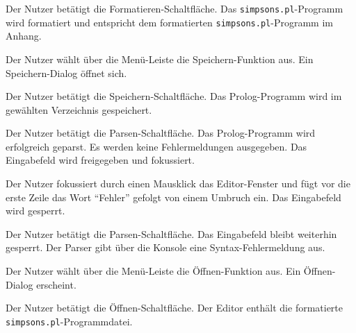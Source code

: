 \documentclass[parskip=full,11pt,twoside]{scrartcl}
\begin{document}
{Der Nutzer betätigt die Formatieren-Schaltfläche.}
{Das \texttt{simpsons.pl}-Programm wird formatiert und entspricht dem formatierten \texttt{simpsons.pl}-Programm im Anhang.}

{Der Nutzer wählt über die Menü-Leiste die Speichern-Funktion aus.}
{Ein Speichern-Dialog öffnet sich.}

{Der Nutzer betätigt die Speichern-Schaltfläche.}
{Das Prolog-Programm wird im gewählten Verzeichnis gespeichert.}

{Der Nutzer betätigt die Parsen-Schaltfläche.}
{Das Prolog-Programm wird erfolgreich geparst. Es werden keine Fehlermeldungen ausgegeben. Das Eingabefeld wird freigegeben und fokussiert.}

{Der Nutzer fokussiert durch einen Mausklick das Editor-Fenster und fügt vor die erste Zeile das Wort \enquote{Fehler} gefolgt von einem Umbruch ein.}
{Das Eingabefeld wird gesperrt.}

{Der Nutzer betätigt die Parsen-Schaltfläche.}
{Das Eingabefeld bleibt weiterhin gesperrt. Der Parser gibt über die Konsole eine Syntax-Fehlermeldung aus.}



{Der Nutzer wählt über die Menü-Leiste die Öffnen-Funktion aus.}
{Ein Öffnen-Dialog erscheint.}

{Der Nutzer betätigt die Öffnen-Schaltfläche.}
{Der Editor enthält die formatierte \texttt{simpsons.pl}-Programmdatei.}
\end{document}
